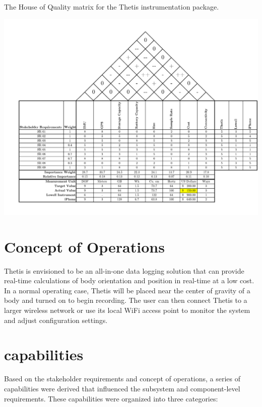 \begin{landscape}
	\begin{table}
		\caption[House of Quality]{The House of Quality matrix for the Thetis instrumentation package.}
		\label{tab:hoq}
		\centering
		\includegraphics[height=\textwidth-24pt]{../include/ThetisHOQ.pdf}
	\end{table}
\end{landscape}

\section{Concept of Operations} 
Thetis is envisioned to be an all-in-one data logging solution that can provide real-time calculations of body orientation and position in real-time at a low cost.
In a normal operating case, Thetis will be placed near the center of gravity of a body and turned on to begin recording.
The user can then connect Thetis to a larger wireless network or use its local WiFi access point to monitor the system and adjust configuration settings.

\section{capabilities} 
Based on the stakeholder requirements and concept of operations, a series of capabilities were derived that influenced the subsystem and component-level requirements.
These capabilities were organized into three categories:

